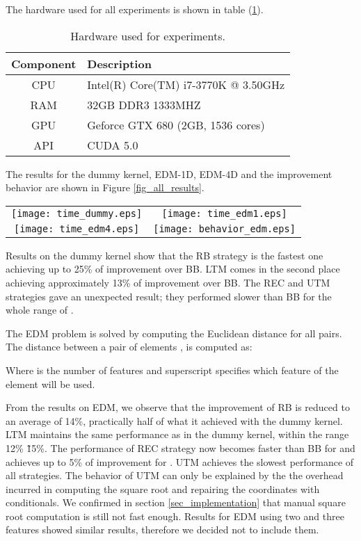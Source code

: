 \documentclass[conference]{IEEEtran}
\begin{document}
The hardware used for all experiments is shown in table (\ref{table_hardware}).
\begin{table}[ht!]
\caption{Hardware used for experiments.}
\begin{center}
\begin{tabular}{|c|l|}
\hline
Component	&	Description\\ \hline
CPU		&	Intel(R) Core(TM) i7-3770K @ 3.50GHz \\
RAM		&	32GB DDR3 1333MHZ\\
GPU		&	Geforce GTX 680 (2GB, 1536 cores) \\
API		&	CUDA 5.0 \\ \hline
\end{tabular}
\end{center}
\label{table_hardware}
\end{table}

The results for the dummy kernel, EDM-1D, EDM-4D and the improvement behavior are shown in Figure \ref{fig_all_results}.
\begin{figure*}[ht!]
\centering
\begin{tabular}{cc}
\texttt{[image: time\_dummy.eps]} & \texttt{[image: time\_edm1.eps]}\\
\texttt{[image: time\_edm4.eps]} & \texttt{[image: behavior\_edm.eps]}
\end{tabular}
\caption{Results for the dummy kernel, EDM and the behavior of  when scaling the number of features.}
\label{fig_all_results}
\end{figure*}

Results on the dummy kernel show that the RB strategy is the fastest one achieving up to 25\% of improvement over BB. LTM comes in the second place achieving approximately 13\% of improvement over BB. 
The REC and UTM strategies gave an unexpected result; they performed slower than BB for the whole range of .

The EDM problem is solved by computing the Euclidean distance  for all pairs. The distance between a pair of elements 
,  is computed as:

Where  is the number of features and superscript  specifies which feature of the element will be used.

From the results on EDM, we observe that the improvement of RB is reduced to an average of 14\%, practically half of what it achieved with the dummy kernel. 
LTM maintains the same performance as in the dummy kernel, within the range 12\% \~ 15\%. The performance of REC strategy now becomes faster than BB for  and achieves up to 5\% of improvement 
for . 
UTM achieves the slowest performance of all strategies. The behavior of UTM can only be explained by the the overhead incurred in computing the square root and repairing the coordinates 
with conditionals. We confirmed in section \ref{sec_implementation} that manual square root computation is still not fast enough. 
Results for EDM using two and three features showed similar results, therefore we decided not to include them.
\end{document}
